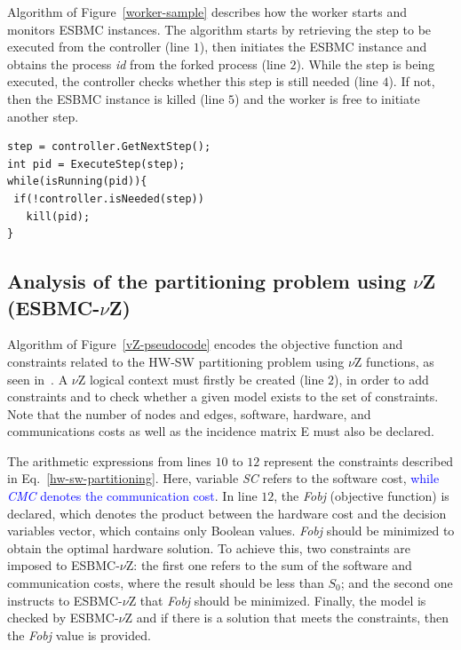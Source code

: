 \documentclass{doublecol-new}
\theoremstyle{TH}{
\newtheorem{lemma}{Lemma}
\newtheorem{theorem}[lemma]{Theorem}
\newtheorem{corrolary}[lemma]{Corrolary}
\newtheorem{conjecture}[lemma]{Conjecture}
\newtheorem{proposition}[lemma]{Proposition}
\newtheorem{claim}[lemma]{Claim}
\newtheorem{stheorem}[lemma]{Wrong Theorem}
\newtheorem{algorithm}{Algorithm}
}
\theoremstyle{THrm}{
\newtheorem{definition}{Definition}[section]
\newtheorem{question}{Question}[section]
\newtheorem{remark}{Remark}
\newtheorem{scheme}{Scheme}
}
\theoremstyle{THhit}{
\newtheorem{case}{Case}[section]
}
\begin{document}
Algorithm of Figure~\ref{worker-sample} describes how the worker starts and monitors ESBMC instances. The algorithm starts by retrieving the step to be executed from the controller (line $1$), then initiates the ESBMC instance and obtains the process \textit{id} from the forked process (line $2$). While the step is being executed, the controller checks whether this step is still needed (line $4$). If not, then the ESBMC instance is killed (line $5$) and the worker is free to initiate another step.

\begin{lstlisting}[basicstyle=\footnotesize,caption={Worker sample.},label={worker-sample},numbersep=7pt,frame=tb,captionpos=t,numberstyle=\tiny]
step = controller.GetNextStep();
int pid = ExecuteStep(step);
while(isRunning(pid)){
 if(!controller.isNeeded(step))
   kill(pid);
}
\end{lstlisting}

\subsection{Analysis of the partitioning problem using $\nu$Z (ESBMC-$\nu$Z)}
\label{Analysis-of-the-partitioning-problem-using-vZ}

Algorithm of Figure~\ref{vZ-pseudocode} encodes the objective function and constraints related to the HW-SW partitioning problem using $\nu$Z functions, as seen in~\cite{Bjorner2014}. A $\nu$Z logical context must firstly be created (line $2$), in order to add constraints and to check whether a given model exists to the set of constraints. Note that the number of nodes and edges, software, hardware, and communications costs as well as the incidence matrix E must also be declared.

The arithmetic expressions from lines $10$ to $12$ represent the constraints described in Eq.~\eqref{hw-sw-partitioning}. Here, variable \textit{SC} refers to the software cost, \textcolor{blue}{while \textit{CMC} denotes the communication cost}. In line $12$, the \textit{Fobj} (objective function) is declared, which denotes the product between the hardware cost and the decision variables vector, which contains only Boolean values. \textit{Fobj} should be minimized to obtain the optimal hardware solution. To achieve this, two constraints are imposed to ESBMC-$\nu$Z: the first one refers to the sum of the software and communication costs, where the result should be less than $S_0$; and the second one instructs to ESBMC-$\nu$Z that \textit{Fobj} should be minimized. Finally, the model is checked by ESBMC-$\nu$Z and if there is a solution that 
meets the constraints, then the \textit{Fobj} value is provided.
\end{document}
